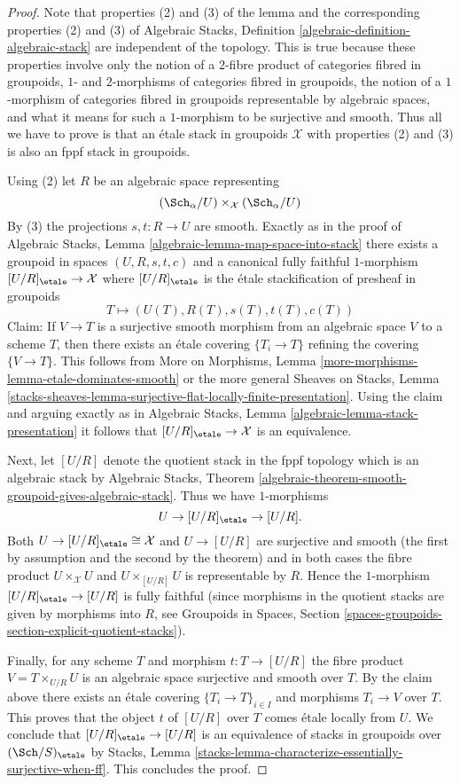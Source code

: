 \begin{proof}
Note that properties (2) and (3) of the lemma and the corresponding
properties (2) and (3) of
Algebraic Stacks, Definition \ref{algebraic-definition-algebraic-stack}
are independent of the topology. This is true because these properties
involve only the notion of a $2$-fibre product of categories fibred in
groupoids, $1$- and $2$-morphisms of categories fibred in groupoids, the
notion of a $1$-morphism of categories fibred in groupoids representable
by algebraic spaces, and what it means for such a $1$-morphism to be
surjective and smooth.
Thus all we have to prove is that an \'etale stack in groupoids
$\mathcal{X}$ with properties (2) and (3) is also an fppf stack in groupoids.

\medskip\noindent
Using (2) let $R$ be an algebraic space representing
$$
(\Sch_\alpha/U) \times_\mathcal{X} (\Sch_\alpha/U)
$$
By (3) the projections $s, t : R \to U$ are smooth. Exactly as in the proof of
Algebraic Stacks, Lemma \ref{algebraic-lemma-map-space-into-stack}
there exists a groupoid in spaces $(U, R, s, t, c)$ and a canonical
fully faithful $1$-morphism $[U/R]_\etale \to \mathcal{X}$
where $[U/R]_\etale$ is the \'etale stackification of presheaf
in groupoids
$$
T \longmapsto (U(T), R(T), s(T), t(T), c(T))
$$
Claim: If $V \to T$ is a surjective smooth morphism from an algebraic space
$V$ to a scheme $T$, then there exists an \'etale covering $\{T_i \to T\}$
refining the covering $\{V \to T\}$. This follows from
More on Morphisms, Lemma \ref{more-morphisms-lemma-etale-dominates-smooth}
or the more general
Sheaves on Stacks, Lemma
\ref{stacks-sheaves-lemma-surjective-flat-locally-finite-presentation}.
Using the claim and arguing exactly as in
Algebraic Stacks, Lemma \ref{algebraic-lemma-stack-presentation}
it follows that $[U/R]_\etale \to \mathcal{X}$ is an
equivalence.

\medskip\noindent
Next, let $[U/R]$ denote the quotient stack in the fppf topology
which is an algebraic stack by
Algebraic Stacks, Theorem
\ref{algebraic-theorem-smooth-groupoid-gives-algebraic-stack}.
Thus we have $1$-morphisms
$$
U \to [U/R]_\etale \to [U/R].
$$
Both $U \to [U/R]_\etale \cong \mathcal{X}$ and
$U \to [U/R]$ are surjective and smooth (the first by assumption
and the second by the theorem) and in both cases the
fibre product $U \times_\mathcal{X} U$ and $U \times_{[U/R]} U$
is representable by $R$. Hence the $1$-morphism
$[U/R]_\etale \to [U/R]$ is fully faithful (since morphisms
in the quotient stacks are given by morphisms into $R$, see
Groupoids in Spaces, Section
\ref{spaces-groupoids-section-explicit-quotient-stacks}).

\medskip\noindent
Finally, for any scheme $T$ and morphism $t : T \to [U/R]$ the fibre product
$V = T \times_{U/R} U$ is an algebraic space surjective and smooth over $T$.
By the claim above there exists an \'etale covering $\{T_i \to T\}_{i \in I}$
and morphisms $T_i \to V$ over $T$. This proves that the object
$t$ of $[U/R]$ over $T$ comes \'etale locally from $U$. We conclude that
$[U/R]_\etale \to [U/R]$ is an equivalence of stacks in
groupoids over $(\Sch/S)_\etale$ by
Stacks, Lemma \ref{stacks-lemma-characterize-essentially-surjective-when-ff}.
This concludes the proof.
\end{proof}
